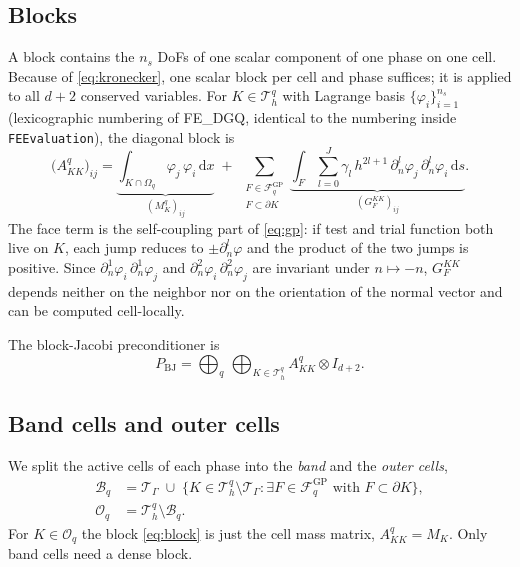 \documentclass[11pt,a4paper]{article}
\newcommand{\Th}{\mathcal{T}_h}
\newcommand{\TG}{\mathcal{T}_\Gamma}
\newcommand{\B}{\mathcal{B}}
\newcommand{\Ou}{\mathcal{O}}
\newcommand{\FGP}{\mathcal{F}^{\mathrm{GP}}}
\newcommand{\PBJ}{P_{\mathrm{BJ}}}
\newcommand{\code}[1]{\nolinkurl{#1}}
\begin{document}
\subsection{Blocks}
A block contains the $n_s$ DoFs of one scalar component of one phase on one cell. Because of
\eqref{eq:kronecker}, one scalar block per cell and phase suffices; it is applied to all $d+2$
conserved variables. For $K\in\Th^q$ with Lagrange basis $\{\varphi_i\}_{i=1}^{n_s}$ (lexicographic
numbering of FE\_DGQ, identical to the numbering inside \code{FEEvaluation}), the diagonal block is
\begin{equation}
  \bigl(A^q_{KK}\bigr)_{ij}
  = \underbrace{\int_{K\cap\Omega_q}\varphi_j\,\varphi_i\,\mathrm{d}x}_{(M^q_K)_{ij}}
  \;+\; \sum_{\substack{F\in\FGP_q\\ F\subset\partial K}} \underbrace{\int_F \sum_{l=0}^{J}\gamma_l\,h^{2l+1}\,
     \partial_n^l\varphi_j\,\partial_n^l\varphi_i\,\mathrm{d}s}_{(G^{KK}_F)_{ij}} .
  \label{eq:block}
\end{equation}
The face term is the self-coupling part of \eqref{eq:gp}: if test and trial function both live on
$K$, each jump reduces to $\pm\partial_n^l\varphi$ and the product of the two jumps is positive.
Since $\partial_n^1\varphi_i\,\partial_n^1\varphi_j$ and $\partial_n^2\varphi_i\,\partial_n^2\varphi_j$
are invariant under $n\mapsto-n$, $G_F^{KK}$ depends neither on the neighbor nor on the orientation
of the normal vector and can be computed cell-locally.

The block-Jacobi preconditioner is
\begin{equation}
  \PBJ = \bigoplus_{q}\,\bigoplus_{K\in\Th^q} A^q_{KK}\otimes I_{d+2}.
\end{equation}

\subsection{Band cells and outer cells}
We split the active cells of each phase into the \emph{band} and the \emph{outer cells},
\begin{align}
  \B_q &= \TG \;\cup\; \bigl\{K\in\Th^q\setminus\TG : \exists F\in\FGP_q \text{ with } F\subset\partial K\bigr\},
  \label{eq:band}\\
  \Ou_q &= \Th^q\setminus\B_q .
\end{align}
For $K\in\Ou_q$ the block \eqref{eq:block} is just the cell mass matrix, $A^q_{KK} = M_K$. Only band
cells need a dense block.
\end{document}
